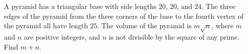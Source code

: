 A pyramid has a triangular base with side lengths $20$, $20$, and $24$. The three edges of the pyramid from the three corners of the base to the fourth vertex of the pyramid all have length $25$. The volume of the pyramid is $m\sqrt{n}$, where $m$ and $n$ are positive integers, and $n$ is not divisible by the square of any prime. Find $m+n$.